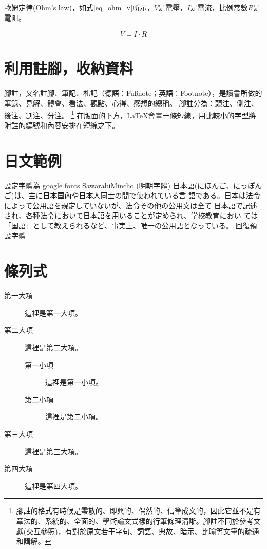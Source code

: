 歐姆定律(Ohm's law)，如式\ref{eq_ohm_v}所示，$V$是電壓，$I$是電流，比例常數$R$是電阻。

\begin{equation}\label{eq_ohm_v}
    \begin{split}
        V = I \cdot R
    \end{split}
\end{equation}
\clearpage

\section{利用註腳，收納資料}
腳註，又名註腳、筆記、札記（德語：Fußnote；英語：Footnote），是讀書所做的筆錄、見解、體會、看法、觀點、心得、感想的總稱。
腳註分為：頭注、側注、後注、割注、分注。
\footnote{腳註的格式有時候是零散的、即興的、偶然的、信筆成文的，因此它並不是有章法的、系統的、全面的、學術論文式樣的行筆條理清晰。腳註不同於參考文獻(交互參照)，有對於原文若干字句、詞語、典故、暗示、比喻等文筆的疏通和講解。}
在版面的下方，\LaTeX 會畫一條短線，用比較小的字型將附註的編號和內容安排在短線之下。

\section{日文範例}
設定字體為 google fonts SawarabiMincho (明朝字體) \newline
\mincho
日本語(にほんご、にっぽんご)は、主に日本国內や日本人同士の間で使われている言
語である。日本は法令によって公用語を規定していないが、法令その他の公用文は全て
日本語で記述され、各種法令において日本語を用いることが定められ、学校教育におい
ては「国語」として教えられるなど、事実上、唯一の公用語となっている。
\ukai
\rmfamily
\newline
回復預設字體

\clearpage

\section{條列式} \label{sec_item}

\begin{description}
\item[第一大項] 這裡是第一大項。
\item[第二大項] 這裡是第二大項。
   \begin{description}
   \item[第一小項] 這裡是第一小項。
   \item[第二小項] 這裡是第二小項。
   \end{description}
\item[第三大項] 這裡是第三大項。
\item[第四大項] 這裡是第四大項。
\end{description}
   

